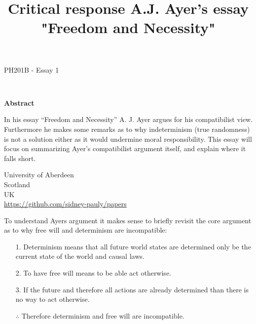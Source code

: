 \documentclass[14pt]{article}
\begin{document}
\title{Critical response A.J. Ayer's essay "Freedom and Necessity"}
\date{}




\fancyhf{}



\begin{titlepage}
  \begin{center}
    \Large
    \textbf{\thetitle}
        
    \vspace{0.4cm}
    \large
    PH201B - Essay 1
        
    \vspace{0.4cm}
    \textbf{\theauthor}\\
    \textbf{\theuoastudentid}

    \vspace{2cm}
    \textbf{Abstract}

  \end{center}

  In his essay “Freedom and Necessity” A. J. Ayer argues for his compatibilist view.
  Furthermore he makes some remarks as to why indeterminism (true randomness) is not a solution either
  as it would undermine moral responsibility. This essay will focus on summarizing Ayer's compatibilist argument itself,
  and explain where it falls short.

  \vfill

  \begin{center}

    University of Aberdeen\\
    Scotland\\
    UK\\
    \thedate
    \vspace{0.4cm}
    \url{https://github.com/sidney-pauly/papers}
  \end{center}
\end{titlepage}


To understand Ayers argument it makes sense to briefly revisit the core argument as to why free will and determinism are incompatible:

\begin{itemize}
  \item[1.] Determinism means that all future world states are determined only be the current state of the world and causal laws.
  \item[2.] To have free will means to be able act otherwise.
  \item[3.] If the future and therefore all actions are already determined than there is no way to act otherwise.
  \item[$\therefore$] Therefore determinism and free will are incompatible.
\end{itemize}
\end{document}
